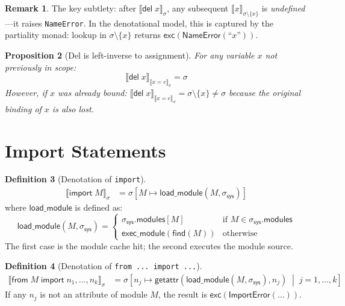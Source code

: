 \documentclass[11pt,a4paper]{report}
\theoremstyle{definition}
\newtheorem{definition}{Definition}[chapter]
\newtheorem{remark}[definition]{Remark}
\theoremstyle{plain}
\newtheorem{proposition}[definition]{Proposition}
\newcommand{\den}[1]{\llbracket #1 \rrbracket}
\begin{document}
\begin{remark}
The key subtlety: after $\den{\mathsf{del}\;x}_\sigma$, any subsequent
$\den{x}_{\sigma \setminus \{x\}}$ is \emph{undefined}---it raises
\lstinline[style=python]{NameError}.  In the denotational model, this is
captured by the partiality monad: lookup in $\sigma \setminus \{x\}$
returns $\mathsf{exc}(\mathsf{NameError}(\text{``$x$''}))$.
\end{remark}

\begin{proposition}[Del is left-inverse to assignment]
For any variable $x$ not previously in scope:
\[
  \den{\mathsf{del}\;x}_{\den{x = e}_\sigma} = \sigma
\]
However, if $x$ was already bound: $\den{\mathsf{del}\;x}_{\den{x = e}_\sigma} = \sigma \setminus \{x\} \neq \sigma$
because the original binding of $x$ is also lost.
\end{proposition}


\section{Import Statements}

\begin{definition}[Denotation of \texttt{import}]
\begin{align}
  \den{\mathsf{import}\;M}_\sigma
    &= \sigma\!\left[M \mapsto \mathsf{load\_module}(M, \sigma_{\mathsf{sys}})\right]
\end{align}
where $\mathsf{load\_module}$ is defined as:
\[
  \mathsf{load\_module}(M, \sigma_{\mathsf{sys}}) =
  \begin{cases}
    \sigma_{\mathsf{sys}}.\mathsf{modules}[M]
      & \text{if $M \in \sigma_{\mathsf{sys}}.\mathsf{modules}$} \\
    \mathsf{exec\_module}(\mathsf{find}(M))
      & \text{otherwise}
  \end{cases}
\]
The first case is the module cache hit; the second executes the module source.
\end{definition}

\begin{definition}[Denotation of \texttt{from ... import ...}]
\begin{align}
  \den{\mathsf{from}\;M\;\mathsf{import}\;n_1, \ldots, n_k}_\sigma
    &= \sigma\!\left[n_j \mapsto \mathsf{getattr}(\mathsf{load\_module}(M, \sigma_{\mathsf{sys}}), n_j)
       \;\middle|\; j = 1, \ldots, k\right]
\end{align}
If any $n_j$ is not an attribute of module $M$, the result is
$\mathsf{exc}(\mathsf{ImportError}(\ldots))$.
\end{definition}
\end{document}
